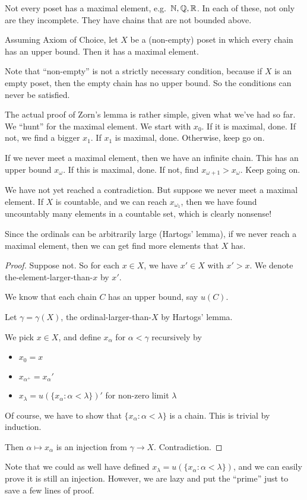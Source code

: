 \documentclass[a4paper]{article}
\begin{document}
Not every poset has a maximal element, e.g.\ $\mathbb{N}, \mathbb{Q}, \mathbb{R}$. In each of these, not only are they incomplete. They have chains that are not bounded above.

\begin{thm}
  Assuming Axiom of Choice, let $X$ be a (non-empty) poset in which every chain has an upper bound. Then it has a maximal element.
\end{thm}
Note that ``non-empty'' is not a strictly necessary condition, because if $X$ is an empty poset, then the empty chain has no upper bound. So the conditions can never be satisfied.

The actual proof of Zorn's lemma is rather simple, given what we've had so far. We ``hunt'' for the maximal element. We start with $x_0$. If it is maximal, done. If not, we find a bigger $x_1$. If $x_1$ is maximal, done. Otherwise, keep go on.

If we never meet a maximal element, then we have an infinite chain. This has an upper bound $x_\omega$. If this is maximal, done. If not, find $x_{\omega + 1} > x_\omega$. Keep going on.

We have not yet reached a contradiction. But suppose we never meet a maximal element. If $X$ is countable, and we can reach $x_{\omega_1}$, then we have found uncountably many elements in a countable set, which is clearly nonsense!

Since the ordinals can be arbitrarily large (Hartogs' lemma), if we never reach a maximal element, then we can get find more elements that $X$ has.

\begin{proof}
  Suppose not. So for each $x\in X$, we have $x'\in X$ with $x' > x$. We denote the-element-larger-than-$x$ by $x'$.

  We know that each chain $C$ has an upper bound, say $u(C)$.

  Let $\gamma = \gamma(X)$, the ordinal-larger-than-$X$ by Hartogs' lemma.

  We pick $x\in X$, and define $x_\alpha$ for $\alpha < \gamma$ recursively by
  \begin{itemize}
    \item $x_0 = x$
    \item $x_{\alpha^+} = x_\alpha'$
    \item $x_{\lambda} = u(\{x_\alpha: \alpha < \lambda\})'$ for non-zero limit $\lambda$
  \end{itemize}
  Of course, we have to show that $\{x_\alpha: \alpha < \lambda\}$ is a chain. This is trivial by induction.

  Then $\alpha \mapsto x_\alpha$ is an injection from $\gamma\to X$. Contradiction.
\end{proof}
Note that we could as well have defined $x_\lambda = u(\{x_\alpha : \alpha < \lambda\})$, and we can easily prove it is still an injection. However, we are lazy and put the ``prime'' just to save a few lines of proof.
\end{document}
